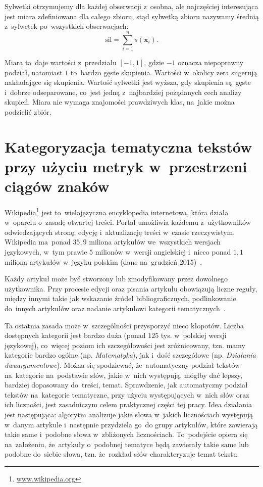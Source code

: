 \documentclass{praca1}
\begin{document}
Sylwetki otrzymujemy dla każdej obserwacji z~osobna, ale najczęściej interesująca jest miara zdefiniowana dla całego zbioru, stąd sylwetką zbioru nazywamy średnią z~sylwetek po~wszystkich obserwacjach:
\begin{equation*}
\mathrm{sil} = \sum\limits_{i=1}^{n}s(\mathbf{x}_i).
\end{equation*}

Miara ta~daje wartości z~przedziału $[-1, 1]$, gdzie $-1$ oznacza niepoprawny podział, natomiast $1$ to~bardzo gęste skupienia. Wartości w~okolicy zera sugerują nakładające się skupienia. Wartość sylwetki jest wyższa, gdy skupienia są~gęste i~dobrze odseparowane, co~jest jedną z~najbardziej pożądanych cech analizy skupień. Miara nie wymaga znajomości prawdziwych klas, na~jakie można podzielić zbiór.



\chapter{Kategoryzacja tematyczna tekstów przy użyciu metryk w~przestrzeni ciągów znaków}

Wikipedia\footnote{\url{www.wikipedia.org}} jest to~wielojęzyczna encyklopedia internetowa, która działa w~oparciu o~zasadę otwartej treści. Portal umożliwia każdemu z~użytkowników odwiedzających stronę, edycję i~aktualizację treści w~czasie rzeczywistym. Wikipedia ma~ponad $35,9$ miliona artykułów we~wszystkich wersjach językowych, w~tym prawie $5$ milionów w~wersji angielskiej i~nieco ponad $1,1$ miliona artykułów w~języku polskim (dane na~grudzień 2015)~\cite{wiki}.

Każdy artykuł może być stworzony lub zmodyfikowany przez dowolnego użytkownika. Przy procesie edycji oraz pisania artykułu obowiązują liczne reguły, między innymi takie jak wskazanie źródeł bibliograficznych, podlinkowanie do~innych artykułów oraz nadanie artykułowi kategorii tematycznych~\cite{wiki}. 

Ta ostatnia zasada może w~szczególności przysporzyć nieco kłopotów. Liczba dostępnych kategorii jest bardzo duża (ponad $125$ tys. w~polskiej wersji językowej), co~więcej poziom ich szczegółowości jest zróżnicowany, tzn. mamy kategorie bardzo ogólne (np. \emph{Matematyka}), jak i~dość szczegółowe (np. \emph{Działania dwuargumentowe}). Można się spodziewać, że~automatyczny podział tekstów na~kategorie na~podstawie słów, jakie w~nich występują, mógłby dać lepszy, bardziej dopasowany do~treści, temat. Sprawdzenie, jak automatyczny podział tekstów na~kategorie tematyczne, przy użyciu występujących w~nich słów oraz ich liczności, jest zasadniczym celem praktycznej części tej pracy. Idea działania jest następująca: algorytm analizuje jakie słowa w~jakich licznościach występują w~danym artykule i~następnie przydziela go~do grupy artykułów, które zawierają takie same i~podobne słowa w~zbliżonych licznościach. To~podejście opiera się na~założeniu, że~artykuły o~podobnej tematyce będą zawierały takie same lub podobne do~siebie słowa, tzn. że~rozkład słów charakteryzuje temat tekstu.
\end{document}
